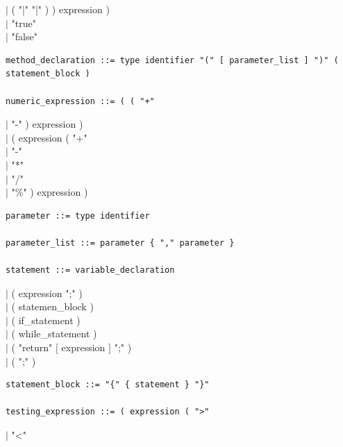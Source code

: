 \documentclass[10pt,a4paper,titlepage]{article}
\begin{document}
				\hspace*{7.5cm}$\mid$ ( "|" "|" ) ) expression )\\
		\hspace*{4.5cm}$\mid$ "true"\\
		\hspace*{4.5cm}$\mid$ "false"
\begin{verbatim}
method_declaration ::= type identifier "(" [ parameter_list ] ")" ( statement_block )

numeric_expression ::= ( ( "+" 
\end{verbatim}
			\hspace*{5.3cm}$\mid$ "-" ) expression ) \\
			\hspace*{4.5cm}$\mid$ ( expression ( "+" \\
				\hspace*{7.7cm}$\mid$ "-" \\
				\hspace*{7.7cm}$\mid$ "*" \\
				\hspace*{7.7cm}$\mid$ "/" \\
				\hspace*{7.7cm}$\mid$ "\%" ) expression ) 
\begin{verbatim}					
parameter ::= type identifier

parameter_list ::= parameter { "," parameter } 

statement ::= variable_declaration
\end{verbatim}
		\hspace*{3cm}$\mid$ ( expression ";" ) \\
		\hspace*{3cm}$\mid$ ( statemen\_block )\\ 
		\hspace*{3cm}$\mid$ ( if\_statement ) \\
		\hspace*{3cm}$\mid$ ( while\_statement )\\
		\hspace*{3cm}$\mid$ ( "return" $[$ expression $]$ ";" )\\
		\hspace*{3cm}$\mid$ ( ";" ) 
\begin{verbatim}
statement_block ::= "{" { statement } "}" 

testing_expression ::= ( expression ( ">"
\end{verbatim} 
					\hspace*{7cm}$\mid$ "<" \\
\end{document}
